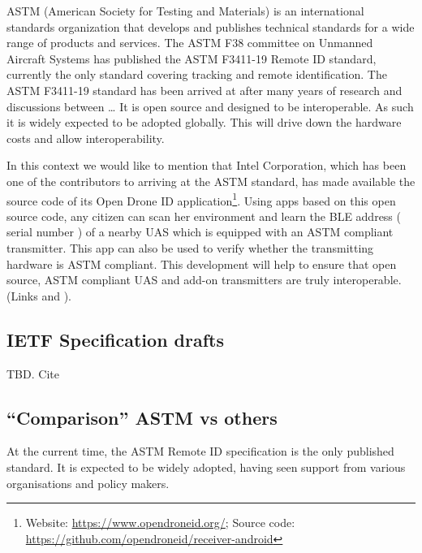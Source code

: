 \documentclass{ua_wgs_base}
\begin{document}
ASTM (American Society for Testing and Materials) is an international
standards organization that develops and publishes technical standards
for a wide range of products and services. The ASTM F38 committee
on Unmanned Aircraft Systems has published the ASTM F3411-19 Remote
ID standard, currently the only standard covering tracking and remote
identification. The ASTM F3411-19 standard has been arrived at after
many years of research and discussions between \dots{} It is open
source and designed to be interoperable. As such it is widely expected
to be adopted globally. This will drive down the hardware costs and
allow interoperability.

In this context we would like to mention that Intel Corporation, which
has been one of the contributors to arriving at the ASTM standard,
has made available the source code of its Open Drone ID application\footnote{Website: \href{https://www.opendroneid.org/}{https://www.opendroneid.org/};
Source code: \href{https://github.com/opendroneid/receiver-android}{https://github.com/opendroneid/receiver-android}}. Using apps based on this open source code, any citizen can scan
her environment and learn the BLE address ( serial number ) of a nearby
UAS which is equipped with an ASTM compliant transmitter. This app
can also be used to verify whether the transmitting hardware is ASTM
compliant. This development will help to ensure that open source,
ASTM compliant UAS and add-on transmitters are truly interoperable.
(Links and ).


\subsection{IETF Specification drafts}

\begin{lyxgreyedout}
TBD. Cite \cite{IETF-DRIP-arch-draft,IETF-DRIP-reqs-draft,IETF-crowd-sourced-rid-draft,IETF-uas-rid-draft,IETF-drip-identity-draft,IETF-drip-operator-privacy-draft,IETF-drip-secure-transport-draft,IETF-drip-auth-draft}%
\end{lyxgreyedout}


\subsection{``Comparison'' ASTM vs others}

At the current time, the ASTM Remote ID specification is the only published standard. It is expected to be widely adopted, having seen support from various organisations and policy makers. 
\end{document}
